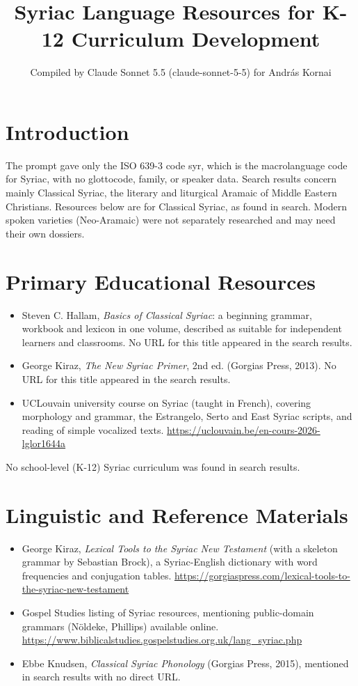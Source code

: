 \documentclass[12pt]{article}
\title{Syriac Language Resources for K-12 Curriculum Development}
\author{Compiled by Claude Sonnet 5.5 (claude-sonnet-5-5) for Andr\'as Kornai}
\date{}
\begin{document}
\maketitle

\section{Introduction}
The prompt gave only the ISO 639-3 code syr, which is the macrolanguage code for Syriac, with no glottocode, family, or speaker data. Search results concern mainly Classical Syriac, the literary and liturgical Aramaic of Middle Eastern Christians. Resources below are for Classical Syriac, as found in search. Modern spoken varieties (Neo-Aramaic) were not separately researched and may need their own dossiers.

\section{Primary Educational Resources}
\begin{itemize}
\item Steven C. Hallam, \emph{Basics of Classical Syriac}: a beginning grammar, workbook and lexicon in one volume, described as suitable for independent learners and classrooms. No URL for this title appeared in the search results.
\item George Kiraz, \emph{The New Syriac Primer}, 2nd ed. (Gorgias Press, 2013). No URL for this title appeared in the search results.
\item UCLouvain university course on Syriac (taught in French), covering morphology and grammar, the Estrangelo, Serto and East Syriac scripts, and reading of simple vocalized texts. \url{https://uclouvain.be/en-cours-2026-lglor1644a}
\end{itemize}
No school-level (K-12) Syriac curriculum was found in search results.

\section{Linguistic and Reference Materials}
\begin{itemize}
\item George Kiraz, \emph{Lexical Tools to the Syriac New Testament} (with a skeleton grammar by Sebastian Brock), a Syriac-English dictionary with word frequencies and conjugation tables. \url{https://gorgiaspress.com/lexical-tools-to-the-syriac-new-testament}
\item Gospel Studies listing of Syriac resources, mentioning public-domain grammars (N\"oldeke, Phillips) available online. \url{https://www.biblicalstudies.gospelstudies.org.uk/lang_syriac.php}
\item Ebbe Knudsen, \emph{Classical Syriac Phonology} (Gorgias Press, 2015), mentioned in search results with no direct URL.
\end{itemize}
\end{document}

